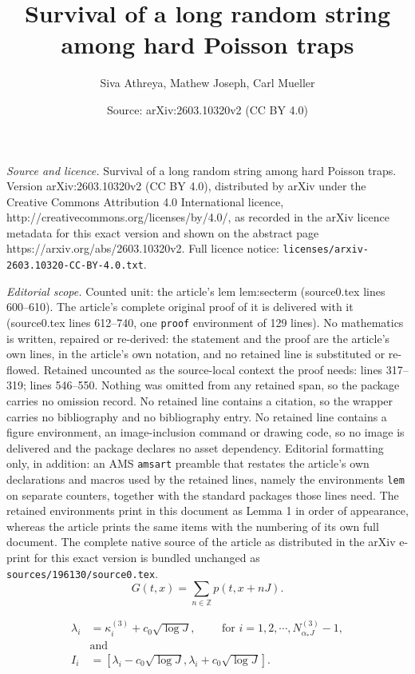 \documentclass[10pt,a4paper]{amsart}
\title{Survival of a long random string among hard Poisson traps}
\author{Siva Athreya, Mathew Joseph, Carl Mueller}
\date{Source: arXiv:2603.10320v2 (CC BY 4.0)}
\newcommand{\Z}{\mathbb{Z}}
\begin{document}
\maketitle

\noindent\emph{Source and licence.} Survival of a long random string among hard Poisson traps. Version arXiv:2603.10320v2 (CC BY 4.0), distributed by arXiv under the Creative Commons Attribution 4.0 International licence, http://creativecommons.org/licenses/by/4.0/, as recorded in the arXiv licence metadata for this exact version and shown on the abstract page https://arxiv.org/abs/2603.10320v2. Full licence notice: \texttt{licenses/arxiv-2603.10320-CC-BY-4.0.txt}.\par\smallskip

\noindent\textit{Editorial scope.} Counted unit: the article's lem lem:secterm (source0.tex lines 600--610). The article's complete original proof of it is delivered with it (source0.tex lines 612--740, one \texttt{proof} environment of 129 lines). No mathematics is written, repaired or re-derived: the statement and the proof are the article's own lines, in the article's own notation, and no retained line is substituted or re-flowed.  Retained uncounted as the source-local context the proof needs: lines 317--319; lines 546--550.  Nothing was omitted from any retained span, so the package carries no omission record.  No retained line contains a citation, so the wrapper carries no bibliography and no bibliography entry.  No retained line contains a figure environment, an image-inclusion command or drawing code, so no image is delivered and the package declares no asset dependency.  Editorial formatting only, in addition: an AMS \texttt{amsart} preamble that restates the article's own declarations and macros used by the retained lines, namely the environments \texttt{lem} on separate counters, together with the standard packages those lines need.  The retained environments print in this document as Lemma 1 in order of appearance, whereas the article prints the same items with the numbering of its own full document.  The complete native source of the article as distributed in the arXiv e-print for this exact version is bundled unchanged as \texttt{sources/196130/source0.tex}.
\begin{equation} \label{eq:hk}
 G(t,x) = \sum_{n\in \Z} p(t,x+nJ).
\end{equation}

\begin{align}
  \label{eq:sp1}  \lambda_i & =  \kappa^{(3)}_i + c_0\sqrt{\log J}, \qquad \text{ for } i=1,2,\cdots,  N^{(3)}_{\alpha_*J}-1 , \nonumber\\
&\mbox{and} \nonumber \\
I_i &= \left[\lambda_i -c_0\sqrt{\log J}, \lambda_i+ c_0\sqrt{\log J}\right].
\end{align}
\end{document}
